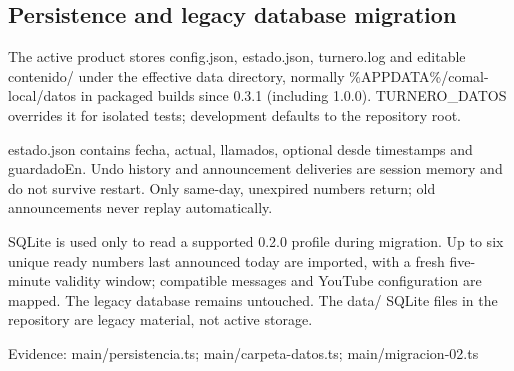 \subsection{Persistence and legacy database migration}

The active product stores config.json, estado.json, turnero.log and editable contenido/ under the effective data directory, normally \%APPDATA\%/comal-local/datos in packaged builds since 0.3.1 (including 1.0.0). TURNERO\_DATOS overrides it for isolated tests; development defaults to the repository root.

estado.json contains fecha, actual, llamados, optional desde timestamps and guardadoEn. Undo history and announcement deliveries are session memory and do not survive restart. Only same-day, unexpired numbers return; old announcements never replay automatically.

SQLite is used only to read a supported 0.2.0 profile during migration. Up to six unique ready numbers last announced today are imported, with a fresh five-minute validity window; compatible messages and YouTube configuration are mapped. The legacy database remains untouched. The data/ SQLite files in the repository are legacy material, not active storage.

Evidence: main/persistencia.ts; main/carpeta-datos.ts; main/migracion-02.ts
